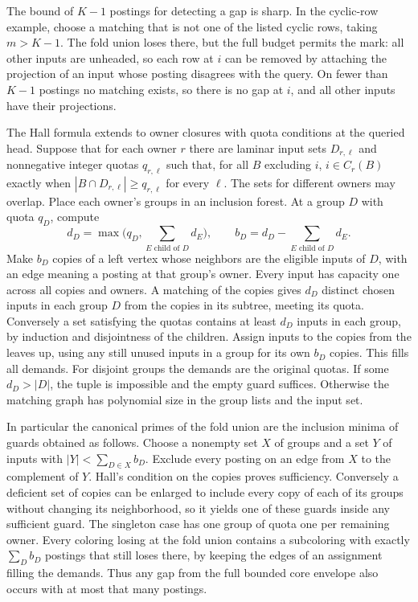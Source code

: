 The bound of $K-1$ postings for detecting a gap is sharp.
In the cyclic-row example, choose a matching that is not
one of the listed cyclic rows, taking $m>K-1$.
The fold union loses there, but the full budget permits
the mark: all other inputs are unheaded, so each row at
$i$ can be removed by attaching the projection of an
input whose posting disagrees with the query. On fewer
than $K-1$ postings no matching exists, so there is no
gap at $i$, and all other inputs have their projections.

The Hall formula extends to owner closures with quota
conditions at the queried head. Suppose that for each
owner $r$ there are laminar input sets $D_{r,\ell}$ and
nonnegative integer quotas $q_{r,\ell}$ such that, for all $B$ excluding
$i$, $i\in C_r(B)$ exactly when
$|B\cap D_{r,\ell}|\ge q_{r,\ell}$ for every $\ell$.
The sets for different owners may overlap. Place each
owner's groups in an inclusion forest. At a group $D$
with quota $q_D$, compute
\[
 d_D=\max\bigl(q_D,\sum_{E\text{ child of }D}d_E\bigr),
 \qquad b_D=d_D-\sum_{E\text{ child of }D}d_E .
\]
Make $b_D$ copies of a left vertex whose neighbors are
the eligible inputs of $D$, with an edge meaning a
posting at that group's owner. Every input has capacity
one across all copies and owners. A matching of the
copies gives $d_D$ distinct chosen inputs in each
group $D$ from the copies in its subtree, meeting
its quota. Conversely a set satisfying the quotas
contains at least $d_D$ inputs in each group, by induction
and disjointness of the children. Assign inputs to the
copies from the leaves up, using any still unused inputs
in a group for its own $b_D$ copies. This fills all demands.
For disjoint groups the demands are the original quotas.
If some $d_D>|D|$, the tuple is impossible and the empty
guard suffices. Otherwise the matching graph has polynomial
size in the group lists and the input set.

In particular the canonical primes of the fold union are
the inclusion minima of guards obtained as follows. Choose
a nonempty set $X$ of groups and a set $Y$ of inputs with
$|Y|<\sum_{D\in X}b_D$. Exclude every posting
on an edge from $X$ to the complement of $Y$. Hall's
condition on the copies proves sufficiency. Conversely
a deficient set of copies can be enlarged to include
every copy of each of its groups without changing its
neighborhood, so it yields one of these guards inside
any sufficient guard. The singleton case has one group
of quota one per remaining owner.
Every coloring losing at the fold union contains a
subcoloring with exactly $\sum_D b_D$ postings
that still loses there, by keeping the edges of an
assignment filling the demands. Thus any gap from the
full bounded core envelope also occurs with at most
that many postings.

